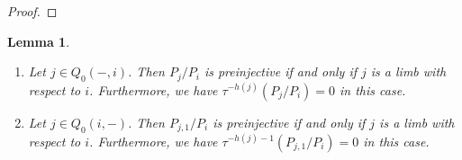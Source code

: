 \documentclass{amsart}
\newcommand{\sayT}[1]{\say[T]{#1}}
\newtheorem{lemma}[theorem]{Lemma}
\numberwithin{equation}{section}
\newcommand{\Sc}[2]{\langle #1,#2\rangle}
\begin{document}
\begin{proof}
\begin{comment}
We first assume that $Q$ itself is of extended Dynkin type.\sayT{continue here, the rest are notes which are maybe not entirely correct}

If $ Q=\tilde E_6$, the root $\alpha$ is regular in any case as $\Sc{\delta}{\alpha}=0$, see \cite[Section 7, Lemma 2]{CB} for the argument and \cite[Section 4]{CB} for a list of the imaginary Schur roots of extended Dynkin quivers.
If $Q=\tilde E_7$, the same argument shows that the root $\alpha$ is regular if $k=3$ and $s=2$ and preinjective if $k=5$, $s=2$ and $q$ is a leaf (which are the only possibilities and where the last case was considered before).
If $Q=\tilde E_8$, the same argument shows that the root $\alpha$ is regular if $s=2$ and $k=3$ and preinjective if $s=2$ and $k=7$, $s=3$ and $k=5$ or $s=5$ and $k=7$ or $k=8$ (which are the only possibilities).\sayT{double-check}
This shows that $\alpha$ is preinjective if $q_1$ is a leaf of $i_s$ in the case $Q$ is of extended Dynkin type $\tilde D_n$, $\tilde E_6$ or $\tilde E_7$. If $Q$ is of type $\tilde E_8$, it is a limb whose neighbor is a leaf or it is a leaf itself.

Assume that $Q$ is wild with $s\geq 3$ and that either $q_1$ is not a leaf or that $s<k-1$. In this case $\alpha$ is regular. If $q_1$ is not a leaf, we already proved that $\alpha$ is regular ($Q$ has a subquiver of extended Dynkin type). Thus assume that $q_1$ is a leaf and $3\leq s\leq k-2$. Moreover, we have $k\geq 6$ if $Q$ has only one $3$-valent vertex. First assume that $k\geq 6$. Then it has a subquiver of type $\tilde E_7$ and the imaginary Schur root does the job.
 \end{comment}





\end{proof}
\begin{lemma}
  \label{lem:preinjective quotients}
  \mbox{}
\begin{enumerate}
\item Let $j\in Q_0(-,i)$. Then $P_j/P_i$ is preinjective if and only if $j$ is a limb with respect to $i$. Furthermore, we have $\tau^{-h(j)}(P_j/P_i)=0$ in this case.
\item Let $j\in Q_0(i,-)$. Then $P_{j,1}/P_i$ is preinjective if and only if $j$ is a limb with respect to $i$. Furthermore, we have $\tau^{-h(j)-1}(P_{j,1}/P_i)=0$ in this case.
\end{enumerate}
\end{lemma}
\end{document}
